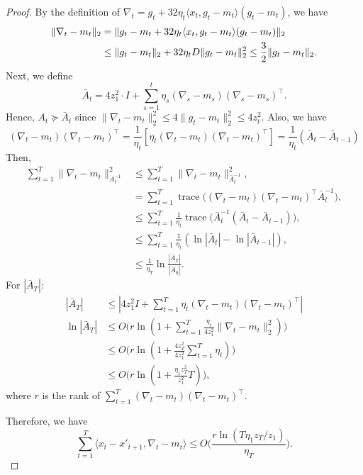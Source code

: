 \documentclass[10pt,a4paper]{amsart}
\DeclareMathOperator{\tr}{trace}
\begin{document}
\begin{proof}
By the definition of $\nabla_t=g_t+32\eta_t\langle x_t,g_t-m_t\rangle(g_t-m_t)$, we have
\begin{align}
\|\nabla_t-m_t\|_2&=\|g_t-m_t+32\eta_t\langle x_t,g_t-m_t\rangle(g_t-m_t)\|_2\notag\\
&\leq \|g_t-m_t\|_2+32\eta_tD\|g_t-m_t\|_2^2\leq \frac{3}{2} \|g_t-m_t\|_2.\label{eq:norm of g_t - m_t and nabla_t - m_t}
\end{align}
Next, we define 
\begin{equation*}
\bar{A}_t=4z_1^2\cdot I+\sum_{s=1}^t \eta_s (\nabla_s-m_s)(\nabla_s-m_s)^\top.
\end{equation*}
Hence, $A_t\succeq \bar{A}_t$ since $\|\nabla_t-m_t\|_2^2\leq 4\|g_t-m_t\|_2^2\leq 4z_t^2$. Also, we have
\begin{equation*}
(\nabla_t-m_t)(\nabla_t-m_t)^\top=\frac{1}{\eta_t}[\eta_t(\nabla_t-m_t)(\nabla_t-m_t)^\top]=\frac{1}{\eta_t} (\bar{A}_t-\bar{A}_{t-1})
\end{equation*}
Then,
\begin{align*}
\sum_{t=1}^T \|\nabla_t-m_t\|_{A_t^{-1}}^2&\leq \sum_{t=1}^T \|\nabla_t-m_t\|_{\bar{A}_t^{-1}}^2,\\
&=\sum_{t=1}^T \tr\Big((\nabla_t-m_t)(\nabla_t-m_t)^\top \bar{A}_t^{-1}\Big),\\
&\leq \sum_{t=1}^T \frac{1}{\eta_t}\tr\Big(\bar{A}_t^{-1}(\bar{A}_t-\bar{A}_{t-1})\Big),\\
&\leq \sum_{t=1}^T \frac{1}{\eta_t}(\ln|\bar{A}_t|-\ln|\bar{A}_{t-1}|),\\
&\leq \frac{1}{\eta_T}\ln\frac{|\bar{A}_T|}{|\bar{A}_0|}.
\end{align*}
For $|\bar{A}_T|$:
\begin{align*}
|\bar{A}_T|&\leq |4z_1^2 I+\sum_{t=1}^T \eta_t(\nabla_t-m_t)(\nabla_t-m_t)^\top|\\
\ln |\bar{A}_T|&\leq O\Big(r\ln(1+\sum_{t=1}^T \frac{\eta_t}{4z_1^2}\|\nabla_t-m_t\|_2^2)\Big)\\
&\leq O\Big(r\ln(1+\frac{4z_T^2}{4z_1^2}\sum_{t=1}^T \eta_t)\Big)\\
&\leq O\Big(r\ln(1+\frac{\eta_1 z_T^2}{z_1^2}T)\Big),
\end{align*}
where $r$ is the rank of $\sum_{t=1}^T (\nabla_t-m_t)(\nabla_t-m_t)^\top$.

Therefore, we have
\begin{equation*}\label{eq:part1_final}
\sum_{t=1}^T\langle x_{t}-x'_{t+1},\nabla_t-m_t\rangle\leq O\Big(\frac{r\ln(T\eta_1 z_T/z_1)}{\eta_T}\Big).
\end{equation*}
\end{proof}
\end{document}
